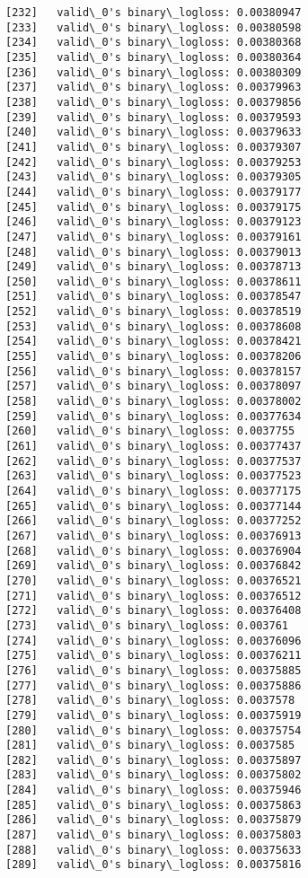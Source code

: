 \documentclass[11pt]{article}
\begin{document}
\begin{Verbatim}[commandchars=\\\{\}]
[232]	valid\_0's binary\_logloss: 0.00380947
[233]	valid\_0's binary\_logloss: 0.00380598
[234]	valid\_0's binary\_logloss: 0.00380368
[235]	valid\_0's binary\_logloss: 0.00380364
[236]	valid\_0's binary\_logloss: 0.00380309
[237]	valid\_0's binary\_logloss: 0.00379963
[238]	valid\_0's binary\_logloss: 0.00379856
[239]	valid\_0's binary\_logloss: 0.00379593
[240]	valid\_0's binary\_logloss: 0.00379633
[241]	valid\_0's binary\_logloss: 0.00379307
[242]	valid\_0's binary\_logloss: 0.00379253
[243]	valid\_0's binary\_logloss: 0.00379305
[244]	valid\_0's binary\_logloss: 0.00379177
[245]	valid\_0's binary\_logloss: 0.00379175
[246]	valid\_0's binary\_logloss: 0.00379123
[247]	valid\_0's binary\_logloss: 0.00379161
[248]	valid\_0's binary\_logloss: 0.00379013
[249]	valid\_0's binary\_logloss: 0.00378713
[250]	valid\_0's binary\_logloss: 0.00378611
[251]	valid\_0's binary\_logloss: 0.00378547
[252]	valid\_0's binary\_logloss: 0.00378519
[253]	valid\_0's binary\_logloss: 0.00378608
[254]	valid\_0's binary\_logloss: 0.00378421
[255]	valid\_0's binary\_logloss: 0.00378206
[256]	valid\_0's binary\_logloss: 0.00378157
[257]	valid\_0's binary\_logloss: 0.00378097
[258]	valid\_0's binary\_logloss: 0.00378002
[259]	valid\_0's binary\_logloss: 0.00377634
[260]	valid\_0's binary\_logloss: 0.0037755
[261]	valid\_0's binary\_logloss: 0.00377437
[262]	valid\_0's binary\_logloss: 0.00377537
[263]	valid\_0's binary\_logloss: 0.00377523
[264]	valid\_0's binary\_logloss: 0.00377175
[265]	valid\_0's binary\_logloss: 0.00377144
[266]	valid\_0's binary\_logloss: 0.00377252
[267]	valid\_0's binary\_logloss: 0.00376913
[268]	valid\_0's binary\_logloss: 0.00376904
[269]	valid\_0's binary\_logloss: 0.00376842
[270]	valid\_0's binary\_logloss: 0.00376521
[271]	valid\_0's binary\_logloss: 0.00376512
[272]	valid\_0's binary\_logloss: 0.00376408
[273]	valid\_0's binary\_logloss: 0.003761
[274]	valid\_0's binary\_logloss: 0.00376096
[275]	valid\_0's binary\_logloss: 0.00376211
[276]	valid\_0's binary\_logloss: 0.00375885
[277]	valid\_0's binary\_logloss: 0.00375886
[278]	valid\_0's binary\_logloss: 0.0037578
[279]	valid\_0's binary\_logloss: 0.00375919
[280]	valid\_0's binary\_logloss: 0.00375754
[281]	valid\_0's binary\_logloss: 0.0037585
[282]	valid\_0's binary\_logloss: 0.00375897
[283]	valid\_0's binary\_logloss: 0.00375802
[284]	valid\_0's binary\_logloss: 0.00375946
[285]	valid\_0's binary\_logloss: 0.00375863
[286]	valid\_0's binary\_logloss: 0.00375879
[287]	valid\_0's binary\_logloss: 0.00375803
[288]	valid\_0's binary\_logloss: 0.00375633
[289]	valid\_0's binary\_logloss: 0.00375816

\end{Verbatim}
\end{document}
